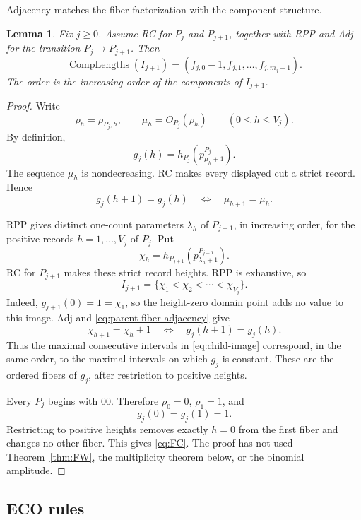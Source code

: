\documentclass[11pt]{article}
\newtheorem{lemma}[theorem]{Lemma}
\theoremstyle{definition}
\theoremstyle{remark}
\begin{document}
Adjacency matches the fiber factorization with the component structure.
\begin{lemma}
\label{lem:AdjFC}
Fix \(j\geq0\).  Assume RC for \(P_j\) and \(P_{j+1}\), together with RPP
and Adj for the transition \(P_j\to P_{j+1}\).  Then
\begin{equation}
\label{eq:FC}
 \operatorname{CompLengths}(I_{j+1})
 =(f_{j,0}-1,f_{j,1},\ldots,f_{j,m_j-1}).
\end{equation}
The order is the increasing order of the components of \(I_{j+1}\).
\end{lemma}

\begin{proof}
Write
\[
 \rho_h=\rho_{P_j,h},
 \qquad \mu_h=O_{P_j}(\rho_h)
 \qquad(0\leq h\leq V_j).
\]
By definition,
\[
 g_j(h)=h_{P_j}(p^{P_j}_{\mu_h+1}).
\]
The sequence \(\mu_h\) is nondecreasing.  RC makes every displayed cut a
strict record.  Hence
\begin{equation}
\label{eq:parent-fiber-adjacency}
 g_j(h+1)=g_j(h)
 \quad\Longleftrightarrow\quad
 \mu_{h+1}=\mu_h.
\end{equation}

RPP gives distinct one-count parameters \(\lambda_h\) of \(P_{j+1}\), in increasing order, for
the positive records \(h=1,\ldots,V_j\) of \(P_j\).  Put
\[
 \chi_h=h_{P_{j+1}}(p^{P_{j+1}}_{\lambda_h+1}).
\]
RC for \(P_{j+1}\) makes these strict record heights.  RPP is exhaustive, so
\begin{equation}
\label{eq:child-image}
 I_{j+1}=\{\chi_1<\chi_2<\cdots<\chi_{V_j}\}.
\end{equation}
Indeed, \(g_{j+1}(0)=1=\chi_1\), so the height-zero domain point adds no
value to this image.
Adj and \eqref{eq:parent-fiber-adjacency} give
\[
 \chi_{h+1}=\chi_h+1
 \quad\Longleftrightarrow\quad
 g_j(h+1)=g_j(h).
\]
Thus the maximal consecutive intervals in \eqref{eq:child-image} correspond,
in the same order, to the maximal intervals on which \(g_j\) is constant.
These are the ordered fibers of \(g_j\), after restriction to positive
heights.

Every \(P_j\) begins with \(00\).  Therefore \(\rho_0=0\), \(\rho_1=1\), and
\[
 g_j(0)=g_j(1)=1.
\]
Restricting to positive heights removes exactly \(h=0\) from the first fiber
and changes no other fiber.  This gives \eqref{eq:FC}.  The proof has not used
Theorem~\ref{thm:FW}, the multiplicity theorem below, or the binomial
amplitude.
\end{proof}

\subsection{ECO rules}
\end{document}
